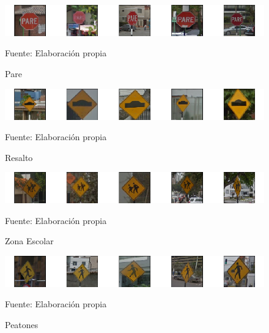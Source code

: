 			\begin{figure}[H]
				\begin{center}
				\includegraphics[width=1\textwidth]{images/desarrollo/imagenes/peru/1__(1).png}
				\end{center}
				\begin{center}
				\caption{\small{Pare}}
				\vskip -0.25cm
				{\small{Fuente: Elaboración propia}}
				\end{center}
				\vspace{-1.5em}
			\end{figure}

			\begin{figure}[H]
				\begin{center}
				\includegraphics[width=1\textwidth]{images/desarrollo/imagenes/peru/1__(2).png}
				\end{center}
				\begin{center}
				\caption{\small{Resalto}}
				\vskip -0.25cm
				{\small{Fuente: Elaboración propia}}
				\end{center}
				\vspace{-1.5em}
			\end{figure}

			\begin{figure}[H]
				\begin{center}
				\includegraphics[width=1\textwidth]{images/desarrollo/imagenes/peru/1__(3).png}
				\end{center}
				\begin{center}
				\caption{\small{Zona Escolar}}
				\vskip -0.25cm
				{\small{Fuente: Elaboración propia}}
				\end{center}
				\vspace{-1.5em}
			\end{figure}

			\begin{figure}[H]
				\begin{center}
				\includegraphics[width=1\textwidth]{images/desarrollo/imagenes/peru/1__(4).png}
				\end{center}
				\begin{center}
				\caption{\small{Peatones}}
				\vskip -0.25cm
				{\small{Fuente: Elaboración propia}}
				\end{center}
				\vspace{-1.5em}
			\end{figure}
			
